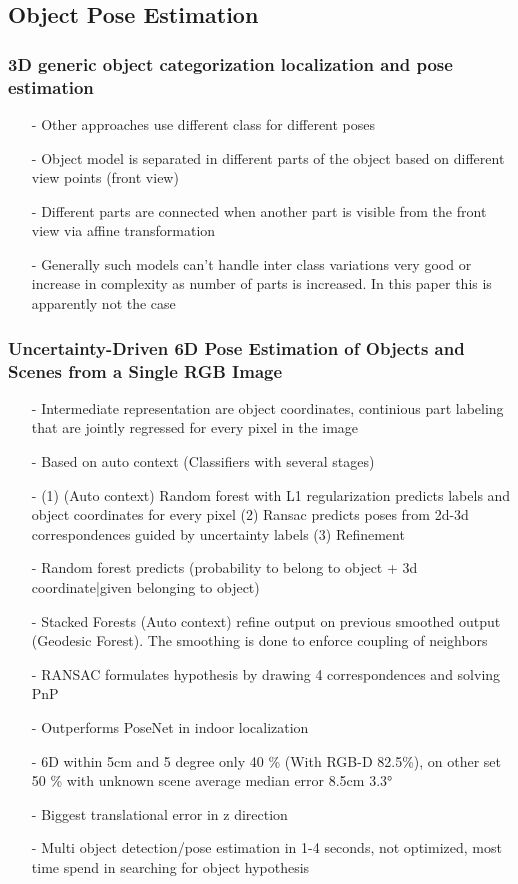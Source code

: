 \documentclass{article}
\begin{document}
\begin{multicols}{2}
	 	\subsection{Object Pose Estimation}
	 	\subsubsection{3D generic object categorization localization and pose estimation \cite{Savarese}}
	 	\begin{itemize}
	 		\item[-] Other approaches use different class for different poses
	 		\item[-] Object model is separated in different parts of the object based on different view points (front view)
	 		\item[-] Different parts are connected when another part is visible from the front view via affine transformation
	 		\item[-] Generally such models can't handle inter class variations very good or increase in complexity as number of parts is increased. In this paper this is apparently not the case
	 	\end{itemize}
	 	\subsubsection{Uncertainty-Driven 6D Pose Estimation of Objects and Scenes from a Single RGB Image
	 		\cite{Brachmann}}
	 	\begin{itemize}
	 	\item[-] Intermediate representation are object coordinates, continious part labeling that are jointly regressed for every pixel in the image
	 	\item[-] Based on auto context (Classifiers with several stages)
	 	\item[-] (1) (Auto context) Random forest with L1 regularization predicts labels and object coordinates for every pixel (2) Ransac predicts poses from 2d-3d correspondences guided by uncertainty labels
	 	(3) Refinement
	 	\item[-] Random forest predicts (probability to belong to object + 3d coordinate|given belonging to object)
	 	\item[-] Stacked Forests (Auto context) refine output on previous smoothed output (Geodesic Forest). The smoothing is done to enforce coupling of neighbors 
	 	\item[-] RANSAC formulates hypothesis by drawing 4 correspondences and solving PnP
	 	\item[-] Outperforms PoseNet in indoor localization
	 	\item[-] 6D within 5cm and 5 degree only 40 \% (With RGB-D 82.5\%), on other set 50 \% with unknown scene average median error 8.5cm 3.3°
	 	\item[-] Biggest translational error in z direction
	 	\item[-] Multi object detection/pose estimation in 1-4 seconds, not optimized, most time spend in searching for object hypothesis
	 	\end{itemize}

\end{multicols}
\end{document}
